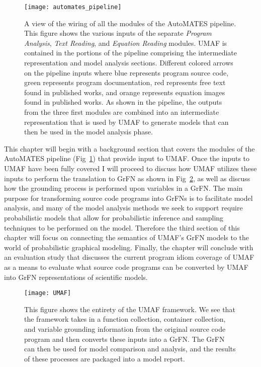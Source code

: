 \begin{figure}[!htbp]
    \label{fig:automates_pipeline}
    \centering
    \texttt{[image: automates\_pipeline]}%
    \caption[The AutoMATES Pipeline]{A view of the wiring of all the modules of the AutoMATES pipeline. This figure shows the various inputs of the separate \textit{Program Analysis}, \textit{Text Reading}, and \textit{Equation Reading} modules. UMAF is contained in the portions of the pipeline comprising the intermediate representation and model analysis sections. Different colored arrows on the pipeline inputs where blue represents program source code, green represents program documentation, red represents free text found in published works, and orange represents equation images found in published works. As shown in the pipeline, the outputs from the three first modules are combined into an intermediate representation that is used by UMAF to generate models that can then be used in the model analysis phase.}
\end{figure}

This chapter will begin with a background section that covers the modules of the AutoMATES pipeline (Fig~\ref{fig:automates_pipeline}) that provide input to UMAF.
Once the inputs to UMAF have been fully covered I will proceed to discuss how UMAF utilizes these inputs to perform the translation to GrFN as shown in Fig~\ref{fig:umaf_diagram}, as well as discuss how the grounding process is performed upon variables in a GrFN.
The main purpose for transforming source code programs into GrFNs is to facilitate model analysis, and many of the model analysis methods we seek to support require probabilistic models that allow for probabilistic inference and sampling techniques to be performed on the model.
Therefore the third section of this chapter will focus on connecting the semantics of UMAF's GrFN models to the world of probabilistic graphical modeling.
Finally, the chapter will conclude with an evaluation study that discusses the current program idiom coverage of UMAF as a means to evaluate what source code programs can be converted by UMAF into GrFN representations of scientific models.

\begin{figure}[!htbp]
    \label{fig:umaf_diagram}
    \centering
    \texttt{[image: UMAF]}%
    \caption[Diagram of UMAF]{This figure shows the entirety of the UMAF framework. We see that the framework takes in a function collection, container collection, and variable grounding information from the original source code program and then converts these inputs into a GrFN. The GrFN can then be used for model comparison and analysis, and the results of these processes are packaged into a model report.}
\end{figure}

